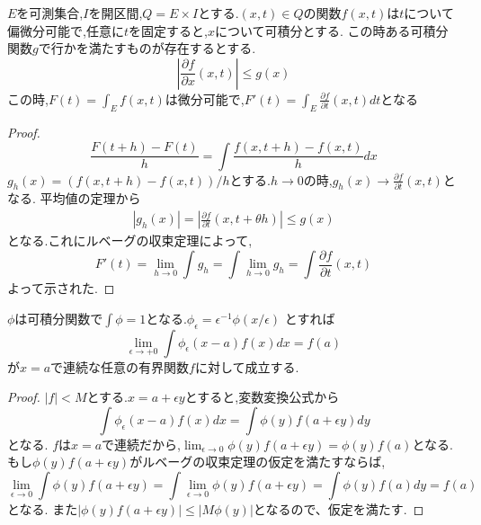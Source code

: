\begin{thm}
 $E$を可測集合,$I$を開区間,$Q = E \times I$とする.$(x, t) \in Q$の関数$f(x, t)$は$t$について偏微分可能で,任意に$t$を固定すると,$x$について可積分とする.
 この時ある可積分関数$g$で行かを満たすものが存在するとする.
 \begin{equation*}
     \left\vert \frac{\partial f}{\partial x} (x, t) \right\vert \le g(x)
 \end{equation*}
 この時,$F(t) = \int_E f(x, t)$は微分可能で,$F'(t) = \int_E \frac{\partial f}{\partial t}(x, t) dt$となる
 
\end{thm}
\begin{proof}
\begin{equation*}
    \frac{F(t + h) - F(t)}{h} = \int \frac{f(x , t+h) - f(x, t) }{h}dx
\end{equation*}
$g_h(x) =  (f(x, t+h) - f(x, t)) /h$とする.$h \to 0$の時,$g_h(x) \to \frac{\partial f}{\partial t}(x, t)$となる.
 平均値の定理から
 \begin{align*}
     |g_h(x)| = | \frac{\partial f}{\partial t}(x, t+ \theta h)| \le g(x) 
 \end{align*}
 となる.これにルベーグの収束定理によって,
 \begin{equation*}
 F'(t) = \lim_{h \to 0} \int g_h  = \int \lim_{h \to 0} g_h = \int \frac{\partial f}{\partial t}(x, t)
 \end{equation*}
 よって示された.
\end{proof}


\begin{prop}
$\phi$は可積分関数で$\int \phi = 1$となる.$\phi_{\epsilon} = \epsilon^{-1} \phi(x / \epsilon)$ とすれば
\begin{equation*}
    \lim_{\epsilon \to +0} \int \phi_{\epsilon}(x -a) f(x) dx = f(a)
\end{equation*}
が$x =a$で連続な任意の有界関数$f$に対して成立する.
\end{prop}
\begin{proof}
$|f| < M$とする.$x = a + \epsilon y $とすると,変数変換公式から
\begin{equation*}
    \int \phi_{\epsilon}(x -a)f(x) dx = \int \phi(y) f(a + \epsilon y) dy
\end{equation*}
となる.
$f$は$x =a$で連続だから,$\lim_{\epsilon \to 0} \phi(y) f(a + \epsilon y) = \phi(y) f(a)$となる.
もし$\phi(y)f(a + \epsilon y)$がルベーグの収束定理の仮定を満たすならば,
\begin{equation*}
    \lim_{\epsilon \to 0} \int \phi(y)f(a + \epsilon y ) = \int \lim_{\epsilon \to 0 } \phi(y) f(a + \epsilon y ) = \int \phi(y) f(a) dy = f(a) 
\end{equation*}
となる.
また$|\phi(y) f(a + \epsilon y)|  \le  | M\phi(y)|$となるので、仮定を満たす.
\end{proof}


